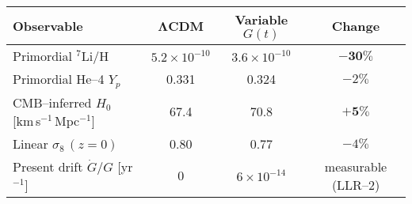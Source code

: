 ﻿\begin{center}
\begin{tabular}{|l|c|c|c|}
\hline
\textbf{Observable} & \textbf{ΛCDM} & \textbf{Variable $G(t)$} & \textbf{Change} \\
\hline
Primordial $^7$Li/H          & $5.2\times10^{-10}$ & $3.6\times10^{-10}$ & $\mathbf{-30\%}$ \\
Primordial He--4 $Y_p$       & 0.331               & 0.324               & $-2\%$ \\
CMB--inferred $H_0$ [km\,s$^{-1}$\,Mpc$^{-1}$] & 67.4 & 70.8 & $\mathbf{+5\%}$ \\
Linear $\sigma_8\,(z=0)$     & 0.80                & 0.77                & $-4\%$ \\
Present drift $\dot G/G$ [yr$^{-1}$] & 0 & $6\times10^{-14}$ & measurable (LLR--2) \\
\hline
\end{tabular}
\end{center}